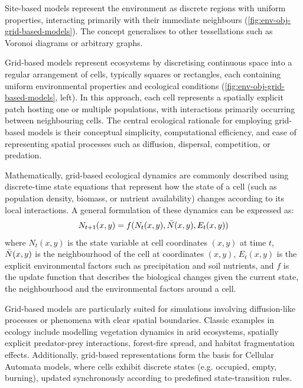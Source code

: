 Site-based models represent the environment as discrete regions with uniform properties, interacting primarily with their immediate neighbours (\cref{fig:env-obj-grid-based-models}). The concept generalises to other tessellations such as Voronoi diagrams or arbitrary graphs.


Grid-based models represent ecosystems by discretising continuous space into a regular arrangement of cells, typically squares or rectangles, each containing uniform environmental properties and ecological conditions (\cref{fig:env-obj-grid-based-models}, left). In this approach, each cell represents a spatially explicit patch hosting one or multiple populations, with interactions primarily occurring between neighbouring cells. The central ecological rationale for employing grid-based models is their conceptual simplicity, computational efficiency, and ease of representing spatial processes such as diffusion, dispersal, competition, or predation.

Mathematically, grid-based ecological dynamics are commonly described using discrete-time state equations that represent how the state of a cell (such as population density, biomass, or nutrient availability) changes according to its local interactions. A general formulation of these dynamics can be expressed as:
\begin{align}
N_{t+1}(x,y) = f(N_t(x,y), \Bar{N}(x, y), E_t(x, y))
\end{align}
where $N_t(x, y)$ is the state variable at cell coordinates $(x, y)$ at time $t$, $\Bar{N}(x, y)$ is the neighbourhood of the cell at coordinates $(x, y)$, $E_t(x, y)$ is the explicit environmental factors such as precipitation and soil nutrients, and $f$ is the update function that describes the biological changes given the current state, the neighbourhood and the environmental factors around a cell.

Grid-based models are particularly suited for simulations involving diffusion-like processes or phenomena with clear spatial boundaries. Classic examples in ecology include modelling vegetation dynamics in arid ecosystems, spatially explicit predator-prey interactions, forest-fire spread, and habitat fragmentation effects. Additionally, grid-based representations form the basis for Cellular Automata models, where cells exhibit discrete states (e.g. occupied, empty, burning), updated synchronously according to predefined state-transition rules.

